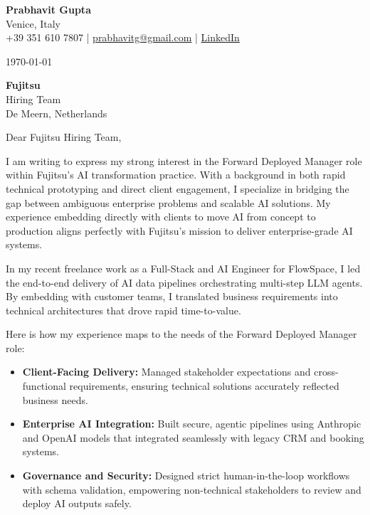 \documentclass[11pt,a4paper]{article}
\begin{document}
\begin{flushleft}
\textbf{\huge Prabhavit Gupta} \\
\vspace{4pt}
Venice, Italy \\
+39 351 610 7807 | \href{mailto:prabhavitg@gmail.com}{prabhavitg@gmail.com} | \href{https://www.linkedin.com/in/prabhavit/}{LinkedIn}
\end{flushleft}

\vspace{1em}

\today

\textbf{Fujitsu} \\
Hiring Team \\
De Meern, Netherlands

\vspace{1em}

Dear Fujitsu Hiring Team,

I am writing to express my strong interest in the Forward Deployed Manager role within Fujitsu's AI transformation practice. With a background in both rapid technical prototyping and direct client engagement, I specialize in bridging the gap between ambiguous enterprise problems and scalable AI solutions. My experience embedding directly with clients to move AI from concept to production aligns perfectly with Fujitsu's mission to deliver enterprise-grade AI systems.

In my recent freelance work as a Full-Stack and AI Engineer for FlowSpace, I led the end-to-end delivery of AI data pipelines orchestrating multi-step LLM agents. By embedding with customer teams, I translated business requirements into technical architectures that drove rapid time-to-value. 

Here is how my experience maps to the needs of the Forward Deployed Manager role:
\begin{itemize}
    \item \textbf{Client-Facing Delivery:} Managed stakeholder expectations and cross-functional requirements, ensuring technical solutions accurately reflected business needs.
    \item \textbf{Enterprise AI Integration:} Built secure, agentic pipelines using Anthropic and OpenAI models that integrated seamlessly with legacy CRM and booking systems.
    \item \textbf{Governance and Security:} Designed strict human-in-the-loop workflows with schema validation, empowering non-technical stakeholders to review and deploy AI outputs safely.
\end{itemize}
\end{document}
